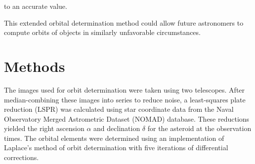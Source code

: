 \documentclass[12pt,journal,compsoc]{IEEEtran}
\begin{document}



to an accurate value. 

This extended orbital determination method could allow future astronomers to
compute orbits of objects in similarly unfavorable circumstances.

\section{Methods}
The images used for orbit determination were taken using two telescopes.
After median-combining these images into series to reduce noise, 
a least-squares plate reduction (LSPR) was calculated
using star coordinate data from the Naval Observatory Merged Astrometric Dataset (NOMAD) database. 
These reductions yielded the right ascension $\alpha$ and declination $\delta$ for the asteroid at the observation times.
The orbital elements were determined using an implementation of Laplace's method of orbit determination 
with five iterations of differential corrections.
\end{document}
